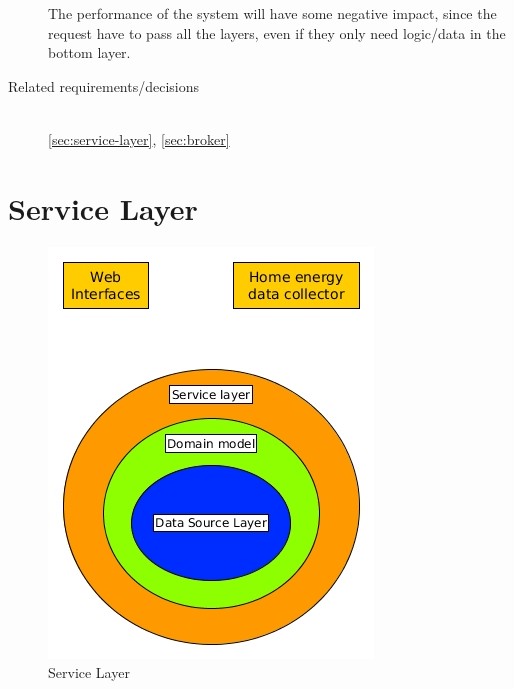 \begin{description}
The performance of the system will have some negative impact, since the request have to pass all the layers, even if they only need logic/data in the bottom layer.


\item [Related requirements/decisions]~\\
\ref{sec:service-layer}, \ref{sec:broker}

\end{description}

\section{Service Layer}
\begin{figure}[H]
\caption{Service Layer}
\centering
\includegraphics[scale=0.5]{4-analysis/images/ServiceLayer.jpg}
\end{figure}

